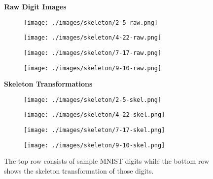 \begin{figure}[H]
    \centering
    \textbf{Raw Digit Images}\par\medskip 
    \begin{subfigure}{.20\textwidth}
        \centering
        \texttt{[image: ./images/skeleton/2-5-raw.png]}
        \label{fig:raw_2_5}
    \end{subfigure}%
    \begin{subfigure}{.20\textwidth}
        \centering
        \texttt{[image: ./images/skeleton/4-22-raw.png]}
        \label{fig:raw_4_22}
    \end{subfigure}%
    \begin{subfigure}{.20\textwidth}
        \centering
        \texttt{[image: ./images/skeleton/7-17-raw.png]}
        \label{fig:raw_7_17}
    \end{subfigure}%
    \begin{subfigure}{.20\textwidth}
        \centering
        \texttt{[image: ./images/skeleton/9-10-raw.png]}
        \label{fig:raw_9_10}
    \end{subfigure}%
    \par\medskip
    \textbf{Skeleton Transformations}\par\medskip
    \begin{subfigure}{.20\textwidth}
        \centering
        \texttt{[image: ./images/skeleton/2-5-skel.png]}
        \label{fig:skel_2_5}
    \end{subfigure}%
    \begin{subfigure}{.20\textwidth}
        \centering
        \texttt{[image: ./images/skeleton/4-22-skel.png]}
        \label{fig:skel_4_22}
    \end{subfigure}%
    \begin{subfigure}{.20\textwidth}
        \centering
        \texttt{[image: ./images/skeleton/7-17-skel.png]}
        \label{fig:skel_7_17}
    \end{subfigure}%
    \begin{subfigure}{.20\textwidth}
        \centering
        \texttt{[image: ./images/skeleton/9-10-skel.png]}
        \label{fig:skel_9_10}
    \end{subfigure}%
    \caption{The top row consists of sample MNIST digits while the bottom row shows the skeleton transformation of those digits.}
    \label{fig:skeleton_samples}
\end{figure}

